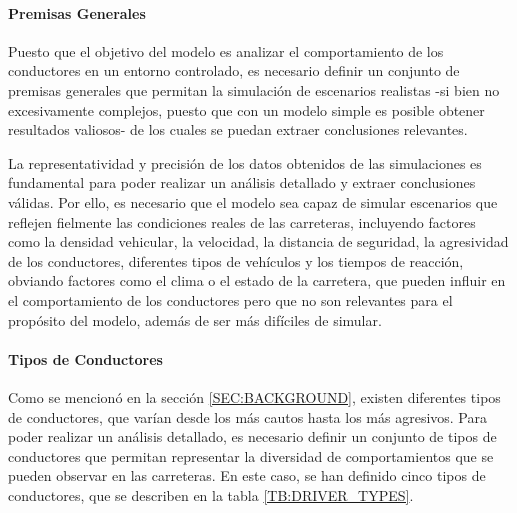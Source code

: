 \paragraph{Premisas Generales}


Puesto que el objetivo del modelo es analizar el comportamiento de los conductores en un entorno controlado, es necesario definir
un conjunto de premisas generales que permitan la simulación de escenarios realistas -si bien no excesivamente complejos, puesto que con un modelo
simple es posible obtener resultados valiosos- de los cuales se puedan extraer conclusiones relevantes.


La representatividad y precisión de los datos obtenidos de las simulaciones es fundamental para poder realizar un análisis detallado y
extraer conclusiones válidas. Por ello, es necesario que el modelo sea capaz de simular escenarios que reflejen fielmente las condiciones
reales de las carreteras, incluyendo factores como la densidad vehicular, la velocidad, la distancia de seguridad, la agresividad de los conductores,
diferentes tipos de vehículos y los tiempos de reacción, obviando factores como el clima o el estado de la carretera, que pueden influir en el
comportamiento de los conductores pero que no son relevantes para el propósito del modelo, además de ser más difíciles de simular.

\paragraph{Tipos de Conductores}


Como se mencionó en la sección \ref{SEC:BACKGROUND}, existen diferentes tipos de conductores, que varían desde los más cautos hasta los más agresivos.
Para poder realizar un análisis detallado, es necesario definir un conjunto de tipos de conductores que permitan representar la diversidad de
comportamientos que se pueden observar en las carreteras. En este caso, se han definido cinco tipos de conductores, que se describen en la tabla
\ref{TB:DRIVER_TYPES}.

